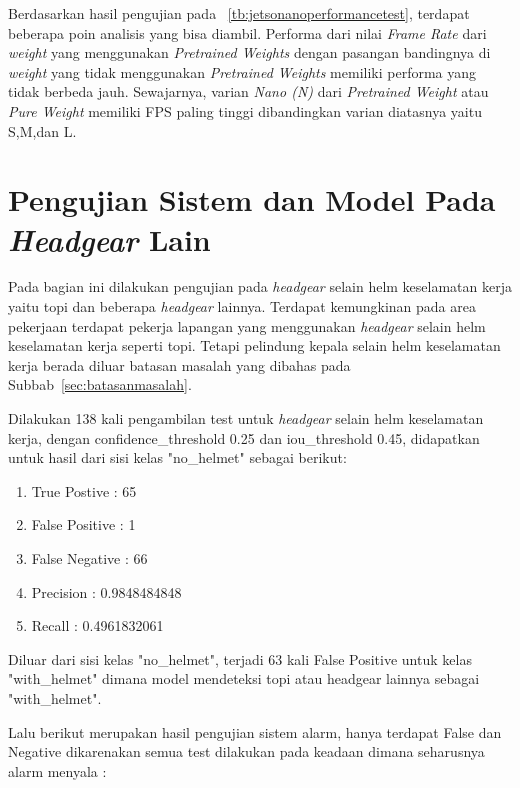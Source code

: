 \FloatBarrier

\par Berdasarkan hasil pengujian pada ~\ref{tb:jetsonanoperformancetest}, terdapat beberapa poin analisis yang bisa diambil.
Performa dari nilai \emph{Frame Rate} dari \emph{weight} yang menggunakan \emph{Pretrained Weights} dengan pasangan bandingnya di \emph{weight}
yang tidak menggunakan \emph{Pretrained Weights} memiliki performa yang tidak berbeda jauh. Sewajarnya, varian \emph{Nano (N)} dari
\emph{Pretrained Weight} atau \emph{Pure Weight} memiliki FPS paling tinggi dibandingkan varian diatasnya yaitu S,M,dan L.

\section{Pengujian Sistem dan Model Pada \emph{Headgear} Lain}
\label{sec:otherheadgear_test}

\par Pada bagian ini dilakukan pengujian pada \emph{headgear} selain helm keselamatan kerja yaitu topi dan beberapa \emph{headgear} lainnya. Terdapat kemungkinan pada area pekerjaan terdapat pekerja lapangan yang menggunakan \emph{headgear} selain helm keselamatan kerja seperti topi. Tetapi pelindung kepala selain helm keselamatan kerja berada diluar batasan masalah yang dibahas pada Subbab~\ref{sec:batasanmasalah}.

Dilakukan 138 kali pengambilan test untuk \emph{headgear} selain helm keselamatan kerja, dengan confidence\_threshold 0.25 dan iou\_threshold 0.45, didapatkan untuk hasil dari sisi kelas "no\_helmet" sebagai berikut:

\begin{enumerate}[nolistsep]
  \item True Postive : 65
  \item False Positive : 1
  \item False Negative : 66
  \item Precision : 0.9848484848
  \item Recall : 0.4961832061
\end{enumerate}

Diluar dari sisi kelas "no\_helmet", terjadi 63 kali False Positive untuk kelas "with\_helmet" dimana model mendeteksi topi atau headgear lainnya sebagai "with\_helmet".

Lalu berikut merupakan hasil pengujian sistem alarm, hanya terdapat False dan Negative dikarenakan semua test dilakukan pada keadaan dimana seharusnya alarm menyala :

